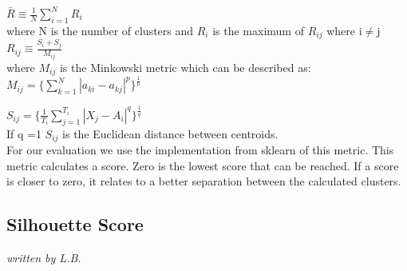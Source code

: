 $ \bar{R} \equiv \frac{1}{N} \sum_{i=1}^{N} R_i  $ \\
where N is the number of clusters and $R_i$ is the maximum of $R_{ij}$ where i$\neq$j \\
	
$R_{ij} \equiv \frac{S_i+ S_j}{M_{ij}}$ \\
where $M_{ij}$ is the Minkowski metric which can be described as: \\ $M_{ij} = \{ \sum_{k=1}^{N} |a_{ki} - a_{kj}  |^p    \} ^{  \frac{1}{p}}   $ 	
	
$S_{ij} = \{\frac{1}{T_i} \sum_{j=1}^{T_i} |X_{j} - A_{i}  |^q    \}^\frac{1}{q}$ \\
	
If q =1 	$S_{ij}$ is the Euclidean distance between centroids.  \\
  
For our evaluation we use the implementation from sklearn of this metric. This metric calculates a score. Zero is the lowest score that can be reached. If a score is closer to zero, it relates to a better separation between the calculated clusters. 

\subsection{Silhouette Score}
\label{Silhouette Score}
\textit{written by L.B.}\\

